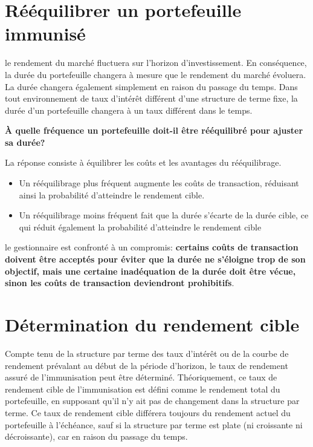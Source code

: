 \documentclass[12pt]{article}
\begin{document}
\section{Rééquilibrer un portefeuille immunisé}
le rendement du marché fluctuera sur l'horizon d'investissement. En conséquence, la durée du portefeuille changera à mesure que le rendement du marché évoluera. La durée changera également simplement en raison du passage du temps. Dans tout environnement de taux d'intérêt différent d'une structure de terme fixe, la durée d'un portefeuille changera à un taux différent dans le temps. 

\vspace{0.5cm}

\textbf{À quelle fréquence un portefeuille doit-il être rééquilibré pour ajuster sa durée?}

\vspace{0.5cm}

La réponse consiste à équilibrer les coûts et les avantages du rééquilibrage.
\begin{itemize}
\item Un rééquilibrage plus fréquent augmente les coûts de transaction, réduisant ainsi la probabilité d'atteindre le rendement cible.
\item Un rééquilibrage moins fréquent fait que la durée s'écarte de la durée cible, ce qui réduit également la probabilité d'atteindre le rendement cible
\end{itemize}
le gestionnaire est confronté à un compromis: \textbf{certains coûts de transaction doivent être acceptés pour éviter que la durée ne s'éloigne trop de son objectif, mais une certaine inadéquation de la durée doit être vécue, sinon les coûts de transaction deviendront prohibitifs}.

\section{Détermination du rendement cible}
Compte tenu de la structure par terme des taux d'intérêt ou de la courbe de rendement prévalant au début de la période d'horizon, le taux de rendement assuré de l'immunisation peut être déterminé. Théoriquement, ce taux de rendement cible de l'immunisation est défini comme le rendement total du portefeuille, en supposant qu'il n'y ait pas de changement dans la structure par terme.  Ce taux de rendement cible différera toujours du rendement actuel du portefeuille à l'échéance, sauf si la structure par terme est plate (ni croissante ni décroissante), car en raison du passage du temps.
\end{document}
